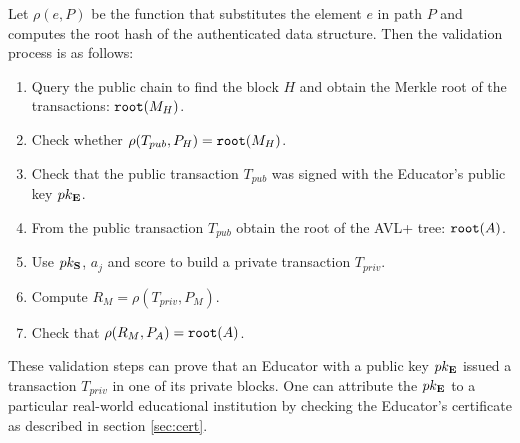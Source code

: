 Let $\rho(e, P)$ be the function that substitutes the element $e$ in path $P$ and computes the root hash of the authenticated data structure. Then the validation process is as follows:
\begin{enumerate}
\item Query the public chain to find the block $H$ and obtain the Merkle root of the transactions: $\mathtt{root}(M_H)$.
\item Check whether $\rho(T_{pub}, P_{H}) = \mathtt{root}(M_H)$.
\item Check that the public transaction $T_{pub}$ was signed with the Educator's public key $pk_{\mathbf{E}}$.
\item From the public transaction $T_{pub}$ obtain the root of the AVL+ tree: $\mathtt{root}(A)$.
\item Use $pk_{\mathbf{S}}$, $a_j$ and score to build a private transaction $T_{priv}$.
\item Compute $R_{M} = \rho(T_{priv}, P_{M})$.
\item Check that $\rho(R_{M}, P_{A}) = \mathtt{root}(A)$.
\end{enumerate}

These validation steps can prove that an Educator with a public key $pk_{\mathbf{E}}$ issued a transaction $T_{priv}$ in one of its private blocks. One can attribute the $pk_{\mathbf{E}}$ to a particular real-world educational institution by checking the Educator's certificate as described in section \ref{sec:cert}.
